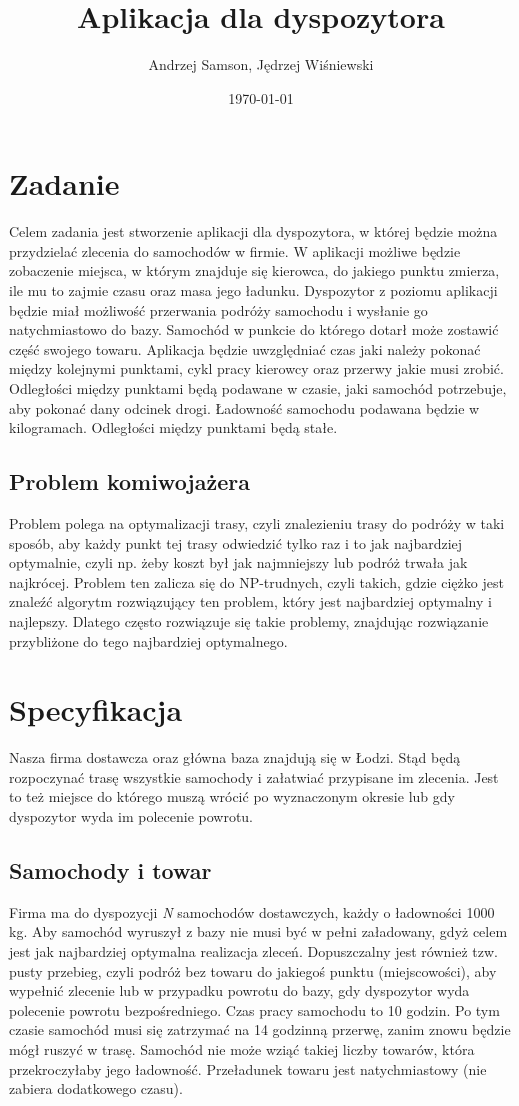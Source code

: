 \documentclass[11pt,a4paper]{mwart}
\title{Aplikacja dla dyspozytora}
\author{Andrzej Samson, Jędrzej Wiśniewski}
\date{\today}
\begin{document}
\maketitle
\section{Zadanie} 
Celem zadania jest stworzenie aplikacji dla dyspozytora, w której będzie można przydzielać zlecenia do samochodów w firmie. W aplikacji możliwe będzie zobaczenie miejsca, w którym znajduje się kierowca, do jakiego punktu zmierza, ile mu to zajmie czasu oraz masa jego ładunku. Dyspozytor z poziomu aplikacji będzie miał możliwość przerwania podróży samochodu i wysłanie go natychmiastowo do bazy. Samochód w punkcie do którego dotarł może zostawić część swojego towaru. Aplikacja będzie uwzględniać czas jaki należy pokonać między kolejnymi punktami, cykl pracy kierowcy oraz przerwy jakie musi zrobić. Odległości między punktami będą podawane w czasie, jaki samochód potrzebuje, aby pokonać dany odcinek drogi. Ładowność samochodu podawana będzie w kilogramach. Odległości między punktami będą stałe.
\subsection{Problem komiwojażera}
Problem polega na optymalizacji trasy, czyli znalezieniu trasy do podróży w taki sposób, aby każdy punkt tej trasy odwiedzić tylko raz i to jak najbardziej optymalnie, czyli np. żeby koszt był jak najmniejszy lub podróż trwała jak najkrócej. Problem ten zalicza się do NP-trudnych, czyli takich, gdzie ciężko jest znaleźć algorytm rozwiązujący ten problem, który jest najbardziej optymalny i najlepszy. Dlatego często rozwiązuje się takie problemy, znajdując rozwiązanie przybliżone do tego najbardziej optymalnego.
\section{Specyfikacja}
Nasza firma dostawcza oraz główna baza znajdują się w Łodzi. Stąd będą rozpoczynać trasę wszystkie samochody i załatwiać przypisane im zlecenia. Jest to też miejsce do którego muszą wrócić po wyznaczonym okresie lub gdy dyspozytor wyda im polecenie powrotu. 
\subsection{Samochody i towar}
Firma ma do dyspozycji \textit{N} samochodów dostawczych, każdy o ładowności 1000 kg. Aby samochód wyruszył z bazy nie musi być w pełni załadowany, gdyż celem jest jak najbardziej optymalna realizacja zleceń. Dopuszczalny jest również tzw. pusty przebieg, czyli podróż bez towaru do jakiegoś punktu (miejscowości), aby wypełnić zlecenie lub w przypadku powrotu do bazy, gdy dyspozytor wyda polecenie powrotu bezpośredniego. Czas pracy samochodu to 10 godzin. Po tym czasie samochód musi się zatrzymać na 14 godzinną przerwę, zanim znowu będzie mógł ruszyć w trasę. Samochód nie może wziąć takiej liczby towarów, która przekroczyłaby jego ładowność. Przeładunek towaru jest natychmiastowy (nie zabiera dodatkowego czasu).
\end{document}
